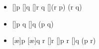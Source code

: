 
\begin{itemize}
\item
  \begin{prooftree*}
  [\ce]{p}
  [\ce]{q}
  []{r \to q}
  []{(r \to p) \to (r \to q)}
  \end{prooftree*}

\item
  \begin{prooftree*}
  [\ai]{p \land q}
  []{q \to (p \land q)}
  \end{prooftree*}

\item
  \begin{prooftree*}
  [\ae]{p}
  [\ae]{q \to r}
  [\ce]{r}
  [\ai]{p \land r}
  []{q \to (p \land r)}
  \end{prooftree*}

\end{itemize}
